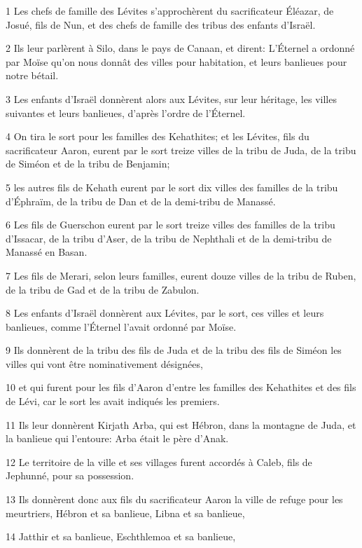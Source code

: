 \par 1 Les chefs de famille des Lévites s'approchèrent du sacrificateur Éléazar, de Josué, fils de Nun, et des chefs de famille des tribus des enfants d'Israël.
\par 2 Ils leur parlèrent à Silo, dans le pays de Canaan, et dirent: L'Éternel a ordonné par Moïse qu'on nous donnât des villes pour habitation, et leurs banlieues pour notre bétail.
\par 3 Les enfants d'Israël donnèrent alors aux Lévites, sur leur héritage, les villes suivantes et leurs banlieues, d'après l'ordre de l'Éternel.
\par 4 On tira le sort pour les familles des Kehathites; et les Lévites, fils du sacrificateur Aaron, eurent par le sort treize villes de la tribu de Juda, de la tribu de Siméon et de la tribu de Benjamin;
\par 5 les autres fils de Kehath eurent par le sort dix villes des familles de la tribu d'Éphraïm, de la tribu de Dan et de la demi-tribu de Manassé.
\par 6 Les fils de Guerschon eurent par le sort treize villes des familles de la tribu d'Issacar, de la tribu d'Aser, de la tribu de Nephthali et de la demi-tribu de Manassé en Basan.
\par 7 Les fils de Merari, selon leurs familles, eurent douze villes de la tribu de Ruben, de la tribu de Gad et de la tribu de Zabulon.
\par 8 Les enfants d'Israël donnèrent aux Lévites, par le sort, ces villes et leurs banlieues, comme l'Éternel l'avait ordonné par Moïse.
\par 9 Ils donnèrent de la tribu des fils de Juda et de la tribu des fils de Siméon les villes qui vont être nominativement désignées,
\par 10 et qui furent pour les fils d'Aaron d'entre les familles des Kehathites et des fils de Lévi, car le sort les avait indiqués les premiers.
\par 11 Ils leur donnèrent Kirjath Arba, qui est Hébron, dans la montagne de Juda, et la banlieue qui l'entoure: Arba était le père d'Anak.
\par 12 Le territoire de la ville et ses villages furent accordés à Caleb, fils de Jephunné, pour sa possession.
\par 13 Ils donnèrent donc aux fils du sacrificateur Aaron la ville de refuge pour les meurtriers, Hébron et sa banlieue, Libna et sa banlieue,
\par 14 Jatthir et sa banlieue, Eschthlemoa et sa banlieue,
